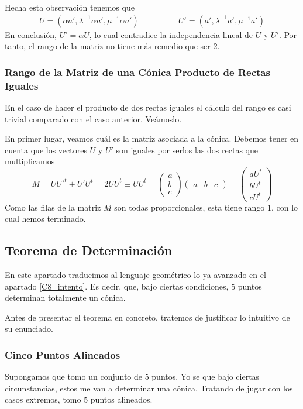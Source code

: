 Hecha esta observación tenemos que
\begin{equation}
\begin{array}{cc}
U=(\alpha a',\lambda^{-1}\alpha a',\mu^{-1}\alpha a')\qquad&\qquad U'=(a',\lambda^{-1}a', \mu^{-1}a')
\end{array}
\end{equation}
En conclusión, $U'=\alpha U$, lo cual contradice la independencia lineal de $U$ y $U'$. Por tanto, el rango de la matriz no tiene más remedio que ser $2$.
\subsubsection{Rango de la Matriz de una Cónica Producto de Rectas Iguales}
En el caso de hacer el producto de dos rectas iguales el cálculo del rango es casi trivial comparado con el caso anterior. Veámoslo.

En primer lugar, veamos cuál es la matriz asociada a la cónica. Debemos tener en cuenta que los vectores $U$ y $U'$ son iguales por serlos las dos rectas que multiplicamos
\begin{equation}
	M=UU'^t+U'U^t=2UU^t\equiv UU^t=\begin{pmatrix}
	a\\
	b\\
	c
	\end{pmatrix}\begin{pmatrix}
	a & b & c
	\end{pmatrix}=\left(\begin{array}{c}
	aU^t\\
	\hline bU^t\\
	\hline cU^t
	\end{array}\right)
\end{equation}
Como las filas de la matriz $M$ son todas proporcionales, esta tiene rango $1$, con lo cual hemos terminado.
\subsection{Teorema de Determinación}
En este apartado traducimos al lenguaje geométrico lo ya avanzado en el apartado \ref{C8_intento}. Es decir, que, bajo ciertas condiciones, $5$ puntos determinan totalmente un cónica.

Antes de presentar el teorema en concreto, tratemos de justificar lo intuitivo de su enunciado.
\subsubsection{Cinco Puntos Alineados}
	Supongamos que tomo un conjunto de $5$ puntos. Yo se que bajo ciertas circunstancias, estos me van a determinar una cónica. Tratando de jugar con los casos extremos, tomo $5$ puntos alineados.
	
